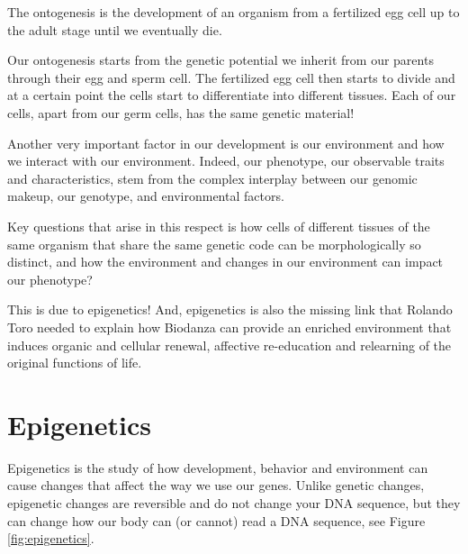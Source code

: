 \documentclass[
  11pt,
]{book}
\begin{document}
The ontogenesis is the development of an organism from a fertilized egg cell up to the adult stage until we eventually die.

Our ontogenesis starts from the genetic potential we inherit from our parents through their egg and sperm cell. The fertilized egg cell then starts to divide and at a certain point the cells start to differentiate into different tissues.
Each of our cells, apart from our germ cells, has the same genetic material!

Another very important factor in our development is our environment and how we interact with our environment.
Indeed, our phenotype, our observable traits and characteristics, stem from the complex interplay between our genomic makeup, our genotype, and environmental factors.

Key questions that arise in this respect is how cells of different tissues of the same organism that share the same genetic code can be morphologically so distinct, and how the environment and changes in our environment can impact our phenotype?

This is due to epigenetics! And, epigenetics is also the missing link that Rolando Toro needed to explain how Biodanza can provide an enriched environment that induces organic and cellular renewal, affective re-education and relearning of the original functions of life.

\hypertarget{epigenetics}{%
\section{Epigenetics}\label{epigenetics}}

Epigenetics is the study of how development, behavior and environment can cause changes that affect the way we use our genes. Unlike genetic changes, epigenetic changes are reversible and do not change your DNA sequence, but they can change how our body can (or cannot) read a DNA sequence, see Figure \ref{fig:epigenetics}.
\end{document}
